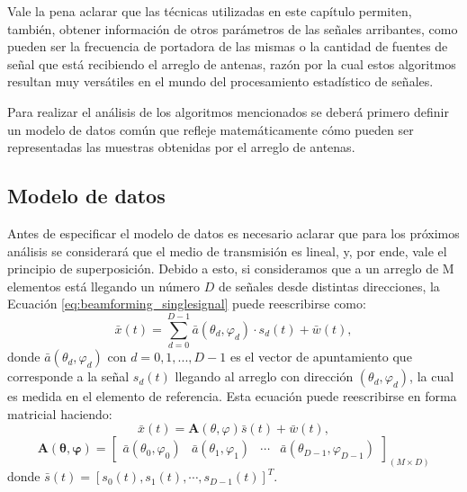 Vale la pena aclarar que las técnicas utilizadas en este capítulo permiten, también, obtener información de otros parámetros de las señales arribantes, como pueden ser la frecuencia de portadora de las mismas o la cantidad de fuentes de señal que está recibiendo el arreglo de antenas, razón por la cual estos algoritmos resultan muy versátiles en el mundo del procesamiento estadístico de señales.

Para realizar el análisis de los algoritmos mencionados se deberá primero definir un modelo de datos común que refleje matemáticamente cómo pueden ser representadas las muestras obtenidas por el arreglo de antenas.

\subsection{Modelo de datos}\label{subc:doaest_datamodel}

Antes de especificar el modelo de datos es necesario aclarar que para los próximos análisis se considerará que el medio de transmisión es lineal, y, por ende, vale el principio de superposición. Debido a esto, si consideramos que a un arreglo de M elementos está llegando un número $D$ de señales desde distintas direcciones, la Ecuación \ref{eq:beamforming_singlesignal} puede reescribirse como:
\begin{equation}
    \bar{x} (t)  =\sum_{d=0}^{D-1} \bar{a}(\theta_d,\varphi_d)\cdot s_d(t) + \bar{w}(t),
\end{equation}
donde $\bar{a}(\theta_d,\varphi_d)$ con $d=0,1,...,D-1$ es el vector de apuntamiento que corresponde a la señal $s_d(t)$ llegando al arreglo con dirección $(\theta_d,\varphi_d)$, la cual es medida en el elemento de referencia. Esta ecuación puede reescribirse en forma matricial haciendo:
\begin{equation}
    \bar{x} (t) = \mathbf{A}(\theta,\varphi) \bar{s}(t) + \bar{w}(t),
\end{equation}
\begin{equation}
    \mathbf{A(\theta,\varphi)} = \begin{bmatrix}
        \bar{a}(\theta_0,\varphi_0) & \bar{a}(\theta_1,\varphi_1) & \cdots & \bar{a}(\theta_{D-1},\varphi_{D-1})
    \end{bmatrix}_{(M\times D)}
\end{equation}
donde $\bar{s}(t)=[s_0(t), s_1(t), \cdots, s_{D-1}(t)]^T$.

